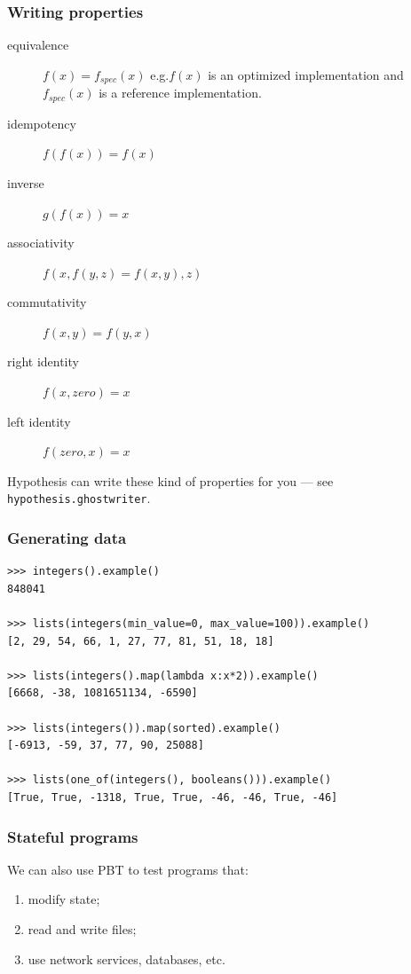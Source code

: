 \documentclass{beamer}
\begin{document}
\begin{frame}
  \frametitle{Writing properties}

  \begin{description}
  \item[equivalence] $f(x) = f_{spec} (x)$
  e.g.\@ $f(x)$ is an optimized implementation
  and $f_{spec}(x)$ is a reference implementation.
    
  \item[idempotency] $f(f(x)) = f(x)$
  \item[inverse]  $g(f(x)) = x$ 
  \item[associativity] $f(x,f(y,z) = f(x,y),z)$
  \item[commutativity] $f(x,y) = f(y,x)$
  \item[right identity] $f(x,zero) = x$
  \item[left identity] $f(zero,x)= x$
  \end{description}
  \bigskip

  Hypothesis can write these kind of properties for you ---
  see \texttt{hypothesis.ghostwriter}.
  
\end{frame}

\begin{frame}[fragile]
  \frametitle{Generating data}

\begin{verbatim}
>>> integers().example()
848041

>>> lists(integers(min_value=0, max_value=100)).example()
[2, 29, 54, 66, 1, 27, 77, 81, 51, 18, 18]

>>> lists(integers().map(lambda x:x*2)).example()
[6668, -38, 1081651134, -6590]

>>> lists(integers()).map(sorted).example()
[-6913, -59, 37, 77, 90, 25088]

>>> lists(one_of(integers(), booleans())).example()
[True, True, -1318, True, True, -46, -46, True, -46]
\end{verbatim}
  
\end{frame}


\begin{frame}
  \frametitle{Stateful programs}

We can also use PBT to test programs that:
\begin{enumerate}
\item modify state;
\item read and write files;
\item use network services, databases, etc.
\end{enumerate}
\end{frame}
\end{document}
